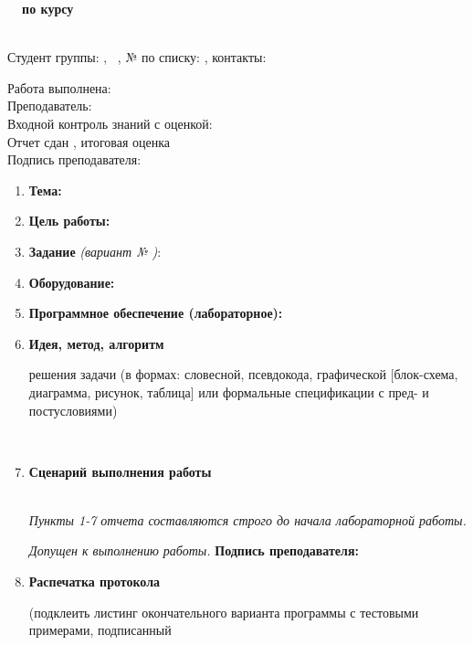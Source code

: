 \pagestyle{main}
\begin{large}
	\textbf{\DocName \ \Number \ по курсу \CourseName}
\end{large}	
\\
Студент группы: \Group, \ \Name, № по списку: \StudentNumber, контакты: \Contacts
\begin{flushright}
	Работа выполнена: \CompletionDate \\
	Преподаватель: \Lecturer \\
	Входной контроль знаний с оценкой: \\
	Отчет сдан \ReportDate, итоговая оценка \Mark \\
	Подпись преподавателя: \Signature
\end{flushright}
\begin{enumerate}
	\item \textbf{Тема:} \ \Theme
	\item \textbf{Цель работы: } \Target
	\item \textbf{Задание} \textit{(вариант № \StudentNumber)}: \Task
	\item \textbf{Оборудование:} \\ \Equipment
	\item \textbf{Программное обеспечение (лабораторное):} \\ \Software
	\item \textbf{Идея, метод, алгоритм} 
	\begin{footnotesize}
		решения задачи (в формах: словесной, псевдокода, графической [блок-схема, диаграмма, рисунок, таблица] или формальные спецификации с пред- и постусловиями)
	\end{footnotesize} 
	\\ \Idea
	\item \textbf{Сценарий выполнения работы}
	\begin{footnotesize}
	\end{footnotesize}
	\Plan
	\\
	\textit{Пункты 1-7 отчета составляются строго до начала лабораторной работы.}
	\begin{flushright}
		\textit{Допущен к выполнению работы.} \textbf{Подпись преподавателя:} 
	\end{flushright}
	\item \textbf{Распечатка протокола}
	\begin{footnotesize}
		(подклеить листинг окончательного варианта программы с тестовыми примерами, подписанный

\end{footnotesize}
\end{enumerate}
